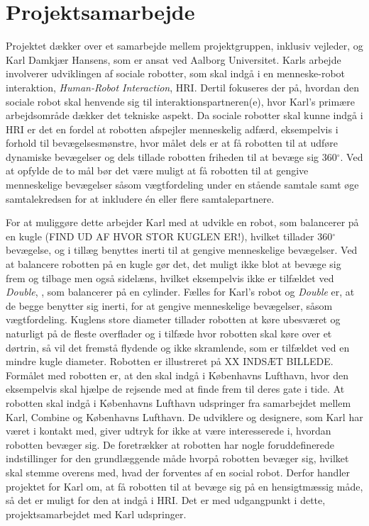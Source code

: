 \section{Projektsamarbejde}
\label{ProjektSamarbejde}
%
Projektet dækker over et samarbejde mellem projektgruppen, inklusiv vejleder, og Karl Damkjær Hansens, som er ansat ved Aalborg Universitet. Karls arbejde involverer udviklingen af sociale robotter, som skal indgå i en menneske-robot interaktion, \textit{Human-Robot Interaction}, HRI. Dertil fokuseres der på, hvordan den sociale robot skal henvende sig til interaktionspartneren(e), hvor Karl's primære arbejdsområde dækker det tekniske aspekt. Da sociale robotter skal kunne indgå i HRI er det en fordel at robotten afspejler menneskelig adfærd, eksempelvis i forhold til bevægelsesmønstre, hvor målet dels er at få robotten til at udføre dynamiske bevægelser og dels tillade robotten friheden til at bevæge sig 360$^{\circ}$. Ved at opfylde de to mål bør det være muligt at få robotten til at gengive menneskelige bevægelser såsom vægtfordeling under en stående samtale samt øge samtalekredsen for at inkludere én eller flere samtalepartnere.

For at muliggøre dette arbejder Karl med at udvikle en robot, som balancerer på en kugle (FIND UD AF HVOR STOR KUGLEN ER!), hvilket tillader 360$^{\circ}$ bevægelse, og i tillæg benyttes inerti til at gengive menneskelige bevægelser. Ved at balancere robotten på en kugle gør det, det muligt ikke blot at bevæge sig frem og tilbage men også sidelæns, hvilket eksempelvis ikke er tilfældet ved \textit{Double}, \parencite{WEB:Double}, som balancerer på en cylinder. Fælles for Karl's robot og \textit{Double} er, at de begge benytter sig inerti, for at gengive menneskelige bevægelser, såsom vægtfordeling. Kuglens store diameter tillader robotten at køre ubesværet og naturligt på de fleste overflader og i tilfæde hvor robotten skal køre over et dørtrin, så vil det fremstå flydende og ikke skramlende, som er tilfældet ved en mindre kugle diameter. Robotten er illustreret på XX INDSÆT BILLEDE.\blankline 
%
%   
Formålet med robotten er, at den skal indgå i Københavns Lufthavn, hvor den eksempelvis skal hjælpe de rejsende med at finde frem til deres gate i tide. At robotten skal indgå i Københavns Lufthavn udspringer fra samarbejdet mellem Karl, Combine og Københavns Lufthavn. De udviklere og designere, som Karl har været i kontakt med, giver udtryk for ikke at være interesserede i, hvordan robotten bevæger sig. De foretrækker at robotten har nogle foruddefinerede indstillinger for den grundlæggende måde hvorpå robotten bevæger sig, hvilket skal stemme overens med, hvad der forventes af en social robot. Derfor handler projektet for Karl om, at få robotten til at bevæge sig på en hensigtmæssig måde, så det er muligt for den at indgå i HRI. Det er med udgangpunkt i dette, projektsamarbejdet med Karl udspringer. 


